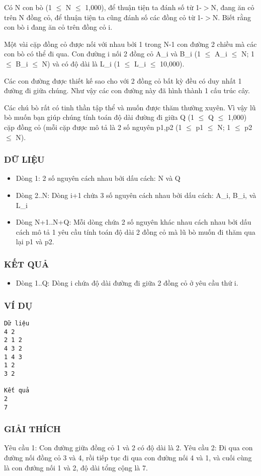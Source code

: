 



   Có N con bò (1  $\le$  N  $\le$  1,000), để thuận tiện ta đánh số từ 1-$>$N, đang ăn cỏ trên N đồng cỏ, để thuận tiện ta cũng đánh số các đồng cỏ từ 1-$>$N. Biết rằng con bò i đang ăn cỏ trên đồng cỏ i.  

   Một vài cặp đồng cỏ được nối với nhau bởi 1 trong N-1 con đường 2 chiều mà các con bò có thể đi qua. Con đường i nối 2 đồng cỏ A\_i và B\_i (1  $\le$  A\_i  $\le$  N; 1  $\le$  B\_i  $\le$  N) và có độ dài là L\_i (1  $\le$  L\_i  $\le$  10,000).  

   Các con đường được thiết kế sao cho với 2 đồng cỏ bất kỳ đều có duy nhất 1 đường đi giữa chúng. Như vậy các con đường này đã hình thành 1 cấu trúc cây.  

   Các chú bò rất có tinh thần tập thể và muốn được thăm thường xuyên. Vì vậy lũ bò muốn bạn giúp chúng tính toán độ dài đường đi giữa Q (1  $\le$  Q  $\le$  1,000) cặp đồng cỏ (mỗi cặp được mô tả là 2 số nguyên p1,p2 (1  $\le$  p1  $\le$  N; 1  $\le$  p2  $\le$  N).  

\subsubsection{   DỮ LIỆU  }
\begin{itemize}
	\item     Dòng 1: 2 số nguyên cách nhau bởi dấu cách: N và Q   
	\item     Dòng 2..N: Dòng i+1 chứa 3 số nguyên cách nhau bởi dấu cách: A\_i,         B\_i, và L\_i   
	\item     Dòng N+1..N+Q: Mỗi dòng chứa 2 số nguyên khác nhau cách nhau bởi dấu cách         mô tả 1 yêu cầu tính toán độ dài 2 đồng cỏ mà lũ bò muốn đi thăm qua lại p1 và p2.   
\end{itemize}

\subsubsection{   KẾT QUẢ  }
\begin{itemize}
	\item     Dòng 1..Q: Dòng i chứa độ dài đường đi giữa 2 đồng cỏ         ở yêu cầu thứ i.   
\end{itemize}

\subsubsection{   VÍ DỤ  }
\begin{verbatim}
Dữ liệu
4 2
2 1 2
4 3 2
1 4 3
1 2
3 2

Kết quả
2
7
\end{verbatim}

\subsubsection{   GIẢI THÍCH  }

   Yêu cầu 1: Con đường giữa đồng cỏ 1 và 2 có độ dài là 2. Yêu cầu 2: Đi qua con đường nối đồng cỏ 3 và 4, rồi tiếp tục đi qua con đường nối 4 và 1, và cuối cùng là con đướng nối 1 và 2, độ dài tổng cộng là 7.  

